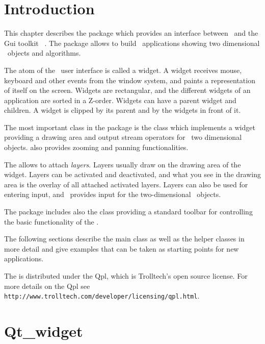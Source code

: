 \section{Introduction}

This chapter describes the  package which provides
an interface between \cgal\  and the  {\sc Gui} toolkit \qt\ .
The  package allows to build \qt\ 
applications  showing two dimensional \cgal\ objects 
and algorithms.


The atom of the \qt\ user interface is called a widget.
A widget receives mouse, keyboard and other 
events from the window system, and paints a representation of itself on the 
screen. Widgets are rectangular, and the different widgets
of an application  are sorted in a Z-order. Widgets
can have a parent widget and  children.
A widget is clipped by its parent and by the widgets in front of it. 


The most important class in the package
is the class  which implements a widget
providing 
a drawing area and output stream operators for \cgal\ 
two dimensional objects.   also provides
zooming and panning functionalities.

The \ccStyle{Qt_widget} allows to attach {\em layers}. Layers usually
draw on the drawing area of the widget. Layers can be activated and
deactivated, and what you see in the drawing area is the overlay of
all attached activated layers. Layers can also be used for entering
input, and \cgal\ provides input \ccc{layers} for the two-dimensional
\cgal\ objects.

The package includes also the class 
 providing a  standard toolbar for controlling the basic functionality
of the \ccStyle{Qt_widget}.

The following sections describe the main class as well as the helper classes
in more detail and give examples that can be taken as starting points for
new applications.


 The  is distributed under
the {\sc Qpl}, which is Trolltech's open source license. For more details
on the {\sc Qpl} see \verb+http://www.trolltech.com/developer/licensing/qpl.html+.

\section{Qt\_widget}
\label{Qt_widget}

